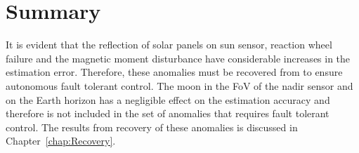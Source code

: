 \section{Summary}
It is evident that the reflection of solar panels on sun sensor, reaction wheel failure and the magnetic moment disturbance have considerable increases in the estimation error. Therefore, these anomalies must be recovered from to ensure autonomous fault tolerant control. The moon in the FoV of the nadir sensor and on the Earth horizon has a negligible effect on the estimation accuracy and therefore is not included in the set of anomalies that requires fault tolerant control. The results from recovery of these anomalies is discussed in Chapter~\ref{chap:Recovery}.
